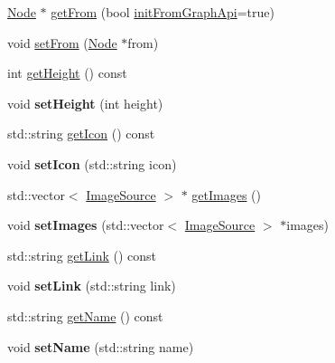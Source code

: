 \begin{DoxyCompactItemize}
\item 
\hyperlink{classfl4cpp_1_1_node}{Node} $\ast$ \hyperlink{classfl4cpp_1_1_photo_node_a1c9e1c7a86f849b7be06ebeb8cec3800}{get\+From} (bool \hyperlink{classfl4cpp_1_1_node_a1dd4594ffd7eb08e9e8c5031d2109a59}{init\+From\+Graph\+Api}=true)
\item 
void \hyperlink{classfl4cpp_1_1_photo_node_adaeac65d2b0f196f07cdd67e876f04e4}{set\+From} (\hyperlink{classfl4cpp_1_1_node}{Node} $\ast$from)
\item 
int \hyperlink{classfl4cpp_1_1_photo_node_ac7a0a4364f214f7a44c5ce061ce28575}{get\+Height} () const 
\item 
void {\bfseries set\+Height} (int height)\hypertarget{classfl4cpp_1_1_photo_node_a5207780743658590619bacd39fba5c86}{}\label{classfl4cpp_1_1_photo_node_a5207780743658590619bacd39fba5c86}

\item 
std\+::string \hyperlink{classfl4cpp_1_1_photo_node_a8a317c147e521cab891b06536c0ec337}{get\+Icon} () const 
\item 
void {\bfseries set\+Icon} (std\+::string icon)\hypertarget{classfl4cpp_1_1_photo_node_a8c8bca77abfba3ea31a9a65c13825b97}{}\label{classfl4cpp_1_1_photo_node_a8c8bca77abfba3ea31a9a65c13825b97}

\item 
std\+::vector$<$ \hyperlink{classfl4cpp_1_1_image_source}{Image\+Source} $>$ $\ast$ \hyperlink{classfl4cpp_1_1_photo_node_a5a0c3a517eda535dda44cd5cf55c3c35}{get\+Images} ()
\item 
void {\bfseries set\+Images} (std\+::vector$<$ \hyperlink{classfl4cpp_1_1_image_source}{Image\+Source} $>$ $\ast$images)\hypertarget{classfl4cpp_1_1_photo_node_aa33e7489885a140edbf8fe727ac72f36}{}\label{classfl4cpp_1_1_photo_node_aa33e7489885a140edbf8fe727ac72f36}

\item 
std\+::string \hyperlink{classfl4cpp_1_1_photo_node_abca07f0e627f5223c55cb33c793eb4fe}{get\+Link} () const 
\item 
void {\bfseries set\+Link} (std\+::string link)\hypertarget{classfl4cpp_1_1_photo_node_a92061549f6cd6a3c8a35a79c03727d33}{}\label{classfl4cpp_1_1_photo_node_a92061549f6cd6a3c8a35a79c03727d33}

\item 
std\+::string \hyperlink{classfl4cpp_1_1_photo_node_a6e2bbd8ec310f3806629ec7bbb57a115}{get\+Name} () const 
\item 
void {\bfseries set\+Name} (std\+::string name)\hypertarget{classfl4cpp_1_1_photo_node_aa9bca01656139020739e29659daade9b}{}\label{classfl4cpp_1_1_photo_node_aa9bca01656139020739e29659daade9b}


\end{DoxyCompactItemize}
